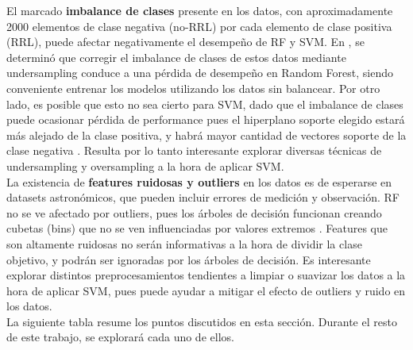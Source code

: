El marcado \textbf{imbalance de clases} presente en los datos, con aproximadamente 2000 elementos de clase negativa (no-RRL) por cada elemento de clase positiva (RRL), puede afectar negativamente el desempeño de RF y SVM. En \cite{jbc}, se determinó que corregir el imbalance de clases de estos datos mediante undersampling conduce a una pérdida de desempeño en Random Forest, siendo conveniente entrenar los modelos utilizando los datos sin balancear. Por otro lado, es posible que esto no sea cierto para SVM, dado que el imbalance de clases puede ocasionar pérdida de performance pues el hiperplano soporte elegido estará más alejado de la clase positiva, y habrá mayor cantidad de vectores soporte de la clase negativa \cite{imbalanced_svm}. Resulta por lo tanto interesante explorar diversas técnicas de undersampling y oversampling a la hora de aplicar SVM. \\

La existencia de \textbf{features ruidosas y outliers} en los datos es de esperarse en datasets astronómicos, que pueden incluir errores de medición y observación. RF no se ve afectado por outliers, pues los árboles de decisión funcionan creando cubetas (bins) que no se ven influenciadas por valores extremos \cite{statisticallearning}. Features que son altamente ruidosas no serán informativas a la hora de dividir la clase objetivo, y podrán ser ignoradas por los árboles de decisión. Es interesante explorar distintos preprocesamientos tendientes a limpiar o suavizar los datos a la hora de aplicar SVM, pues puede ayudar a mitigar el efecto de outliers y ruido en los datos. \\

La siguiente tabla resume los puntos discutidos en esta sección. Durante el resto de este trabajo, se explorará cada uno de ellos. 

